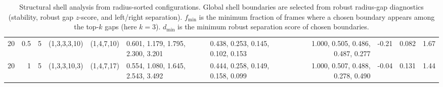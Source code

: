 \begin{table}[t]
\begin{adjustbox}{max width=\textwidth}
\begin{tabular}{rrrllllrrr}
20 & 0.5 & 5 & (1,3,3,3,10) & (1,4,7,10) & 0.601, 1.179, 1.795, 2.300, 3.201 & 0.438, 0.253, 0.145, 0.102, 0.153 & 1.000, 0.505, 0.486, 0.487, 0.277 & -0.21 & 0.082 & 1.67 \\
20 & 1 & 5 & (1,3,3,10,3) & (1,4,7,17) & 0.554, 1.080, 1.645, 2.543, 3.492 & 0.444, 0.258, 0.149, 0.158, 0.099 & 1.000, 0.507, 0.488, 0.278, 0.490 & -0.04 & 0.131 & 1.44 \\
\bottomrule
\end{tabular}
\end{adjustbox}
\caption{Structural shell analysis from radius-sorted configurations. Global shell boundaries are selected from robust radius-gap diagnostics (stability, robust gap $z$-score, and left/right separation). $f_{\min}$ is the minimum fraction of frames where a chosen boundary appears among the top-$k$ gaps (here $k=3$). $d_{\min}$ is the minimum robust separation score of chosen boundaries.}
\label{tab:shell_summary}
\end{table}